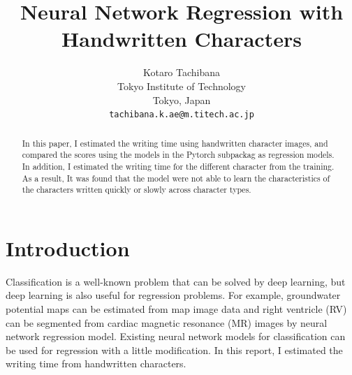 \documentclass[10pt,twocolumn,letterpaper]{article}
\begin{document}
\title{Neural Network Regression with Handwritten Characters}

\author{Kotaro Tachibana\\
Tokyo Institute of Technology\\
Tokyo, Japan\\
{\tt\small tachibana.k.ae@m.titech.ac.jp}
}

\maketitle
\ificcvfinal\thispagestyle{empty}\fi

\begin{abstract}
    In this paper, I estimated the writing time using handwritten character images, and compared the scores using the models in the Pytorch subpackag as regression models.
    In addition, I estimated the writing time for the different character from the training.
    As a result, It was found that the model were not able to learn the characteristics of the characters written quickly or slowly across character types.
\end{abstract}

\section{Introduction}

Classification is a well-known problem
that can be solved by deep learning,
but deep learning is also useful for regression problems.
For example, groundwater potential maps can be estimated from map image data \cite{panahi2020spatial} and
right ventricle (RV) can be segmented from cardiac magnetic resonance (MR) images \cite{chen2018correlated}
by neural network regression model.
Existing neural network models for classification can be used for regression with a little modification.
In this report, I estimated the writing time from handwritten characters.
\end{document}
